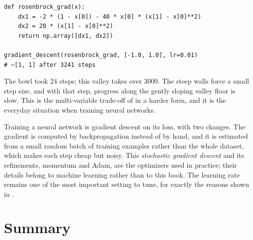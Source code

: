 \begin{lstlisting}
def rosenbrock_grad(x):
    dx1 = -2 * (1 - x[0]) - 40 * x[0] * (x[1] - x[0]**2)
    dx2 = 20 * (x[1] - x[0]**2)
    return np.array([dx1, dx2])

gradient_descent(rosenbrock_grad, [-1.0, 1.0], lr=0.01)
# ~[1, 1] after 3241 steps
\end{lstlisting}

The bowl took $24$ steps; this valley takes over $3000$. The steep walls
force a small step size, and with that step, progress along the gently
sloping valley floor is slow. This is the multi-variable trade-off of
 in a harder form, and it is the everyday
situation when training neural networks.

\begin{aibox}
  Training a neural network is gradient descent on its loss, with two
  changes. The gradient is computed by backpropagation instead of by
  hand, and it is estimated from a small random batch of
  training examples rather than the whole dataset, which makes each step
  cheap but noisy. This \emph{stochastic gradient descent} and its
  refinements, momentum and Adam, are the optimizers used in practice;
  their details belong to machine learning rather than to this book. The
  learning rate remains one of the most important setting to tune, for exactly
  the reasons shown in .
\end{aibox}

\section{Summary}
\label{sec:ch02-summary}

